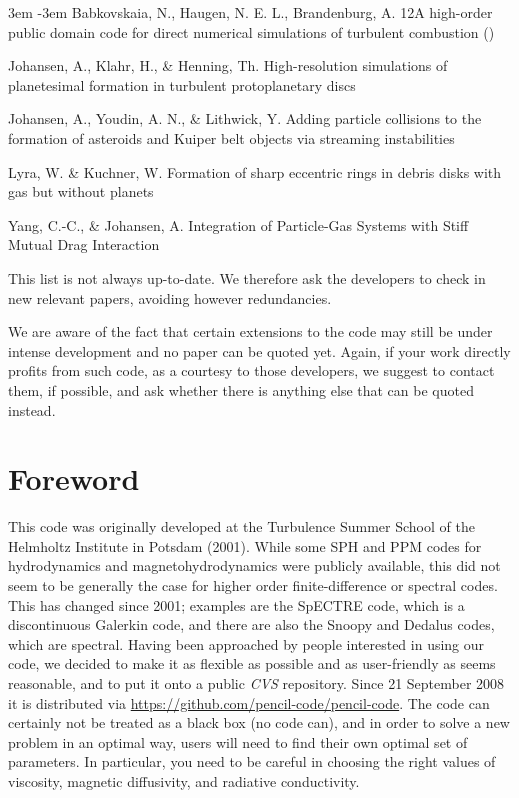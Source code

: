 \documentclass[\mydriver,12pt,twoside,notitlepage,a4paper]{article}
\makeatletter
\newcommand{\name}[2][]{%
  \def\index@{#1}%
  \textsl{#2\/}%
  \ifx\index@\@empty\index{#2@\MakeUppercase #2}%
  \else\index{#1}%
  \fi%
}
\makeatother
\begin{document}
\begin{list}{}{\leftmargin 3em \itemindent -3em\listparindent \itemindent
\itemsep 0pt \parsep 1pt}
Babkovskaia, N., Haugen, N. E. L., Brandenburg, A.
{12}{A high-order public domain code for direct numerical simulations of turbulent combustion}
()

Johansen, A., Klahr, H., \& Henning, Th.
{High-resolution simulations of planetesimal formation in turbulent protoplanetary discs}

Johansen, A., Youdin, A. N., \& Lithwick, Y.
{Adding particle collisions to the formation of asteroids and Kuiper belt objects via streaming instabilities}

Lyra, W. \& Kuchner, W. 
{Formation of sharp eccentric rings in debris disks with gas but without planets}

Yang, C.-C., \& Johansen, A.
{Integration of Particle-Gas Systems with Stiff Mutual Drag Interaction}

\end{list}
This list is not always up-to-date.
We therefore ask the developers to check in new relevant papers,
avoiding however redundancies.

We are aware of the fact that certain extensions to the code may
still be under intense development and no paper can be quoted yet.
Again, if your work directly profits from such code,
as a courtesy to those developers, we suggest to contact them,
if possible, and ask whether there is anything else that can be quoted
instead.

\clearpage


\section*{Foreword}

This code was originally developed at the Turbulence Summer School of the
Helmholtz Institute in Potsdam (2001).
While some SPH and PPM codes for hydrodynamics and magnetohydrodynamics
were publicly available, this did not seem to be generally
the case for higher order finite-difference or spectral codes.
This has changed since 2001; examples are the SpECTRE code,
which is a discontinuous Galerkin code, and there are also the
Snoopy and Dedalus codes, which are spectral.
Having been approached by people interested in using our code, we
decided to make it as flexible as possible and as user-friendly as seems
reasonable, and to put it onto a public \name{CVS} repository.
Since 21 September 2008 it is distributed via
\url{https://github.com/pencil-code/pencil-code}.
The code can certainly not be treated as a black box (no code can), and in
order to solve a new problem in an optimal way, users will need to find their
own optimal set of parameters.
In particular, you need to be careful in choosing
the right values of viscosity, magnetic diffusivity, and radiative
conductivity.
\end{document}
